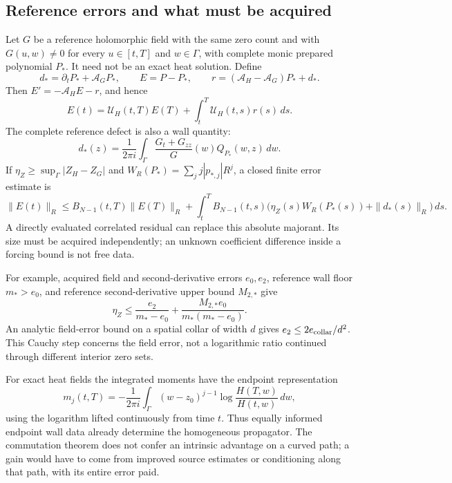 \subsection{Reference errors and what must be acquired}

Let $G$ be a reference holomorphic field with the same zero count and with
$G(u,w)\ne0$ for every $u\in[t,T]$ and $w\in\Gamma$, with complete monic prepared polynomial $P_*$. It need not be an exact
heat solution. Define
\[
 d_*=\partial_tP_*+\mathcal A_GP_*,\qquad E=P-P_*,\qquad
 r=(\mathcal A_H-\mathcal A_G)P_*+d_*.
\]
Then $E'=-\mathcal A_HE-r$, and hence
\begin{equation}\label{eq:paid-duhamel}
 E(t)=\mathcal U_H(t,T)E(T)+\int_t^T\mathcal U_H(t,s)r(s)\,ds.
\end{equation}
The complete reference defect is also a wall quantity:
\[
 d_*(z)=\frac1{2\pi i}\int_\Gamma
                   \frac{G_t+G_{zz}}G(w)Q_{P_*}(w,z)\,dw.
\]
If $\eta_Z\ge\sup_\Gamma|Z_H-Z_G|$ and
$W_R(P_*)=\sum_jj|p_{*,j}|R^j$, a closed finite error estimate is
\begin{equation}\label{eq:paid-error}
 \|E(t)\|_R\le B_{N-1}(t,T)\|E(T)\|_R+
 \int_t^TB_{N-1}(t,s)
       \bigl(\eta_Z(s)W_R(P_*(s))+\|d_*(s)\|_R\bigr)\,ds.
\end{equation}
A directly evaluated correlated residual can replace this absolute majorant.
Its size must be acquired independently; an unknown coefficient difference
inside a forcing bound is not free data.

For example, acquired field and second-derivative errors $e_0,e_2$, reference
wall floor $m_*>e_0$, and reference second-derivative upper bound $M_{2,*}$ give
\begin{equation}\label{eq:source-quotient-budget}
 \eta_Z\le\frac{e_2}{m_*-e_0}
              +\frac{M_{2,*}e_0}{m_*(m_*-e_0)}.
\end{equation}
An analytic field-error bound on a spatial collar of width $d$ gives
$e_2\le2e_{\rm collar}/d^2$. This Cauchy step concerns the field error,
not a logarithmic ratio continued through different interior zero sets.

For exact heat fields the integrated moments have the endpoint representation
\begin{equation}\label{eq:source-endpoint-log}
 m_j(t,T)=-\frac1{2\pi i}\int_\Gamma(w-z_0)^{j-1}
              \log\frac{H(T,w)}{H(t,w)}\,dw,
\end{equation}
using the logarithm lifted continuously from time $t$. Thus equally informed
endpoint wall data already determine the homogeneous propagator. The
commutation theorem does not confer an intrinsic advantage on a curved path;
a gain would have to come from improved source estimates or conditioning along
that path, with its entire error paid.

